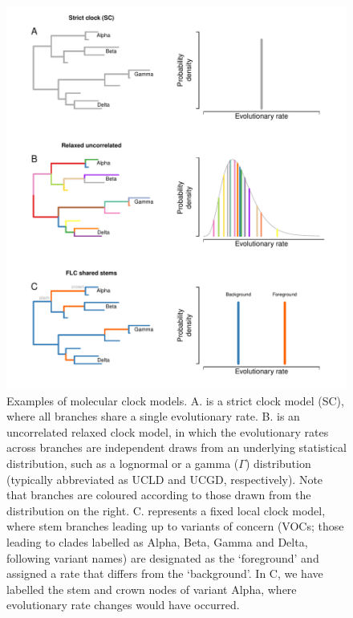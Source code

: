 \documentclass[11pt]{article}
\begin{document}
\begin{figure}[H]
	\begin{center}
		\includegraphics[width=17cm]{figures/clocks.pdf}%
		\vspace{-0.5cm}
		\caption{Examples of molecular clock models. A. is a strict clock model (SC), where all branches share a single evolutionary rate. B. is an uncorrelated relaxed clock model, in which the evolutionary rates across branches are independent draws from an underlying statistical distribution, such as a lognormal or a gamma ($\Gamma$) distribution (typically abbreviated as UCLD and UCGD, respectively). Note that branches are coloured according to those drawn from the distribution on the right. C. represents a fixed local clock model, where stem branches leading up to variants of concern (VOCs; those leading to clades labelled as Alpha, Beta, Gamma and Delta, following variant names) are designated as the `foreground' and assigned a rate that differs from the `background'. In C, we have labelled the stem and crown nodes of variant Alpha, where evolutionary rate changes would have occurred.}
		\label{figure:clock_models}
	\end{center}
\end{figure}
\end{document}
